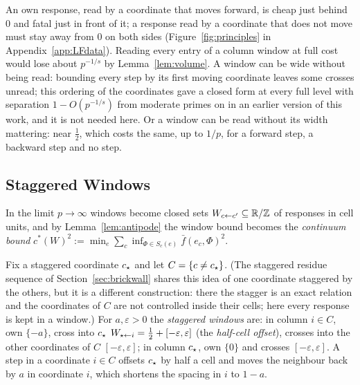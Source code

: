 An own response, read by a coordinate that moves forward, is cheap just behind $0$ and fatal just in front of it; a response read by a coordinate that does not move must stay away from $0$ on both sides (Figure~\ref{fig:principles} in Appendix~\ref{app:LFdata}). Reading every entry of a column window at full cost would lose about $p^{-1/s}$ by Lemma~\ref{lem:volume}. A window can be wide without being read: bounding every step by its first moving coordinate leaves some crosses unread; this ordering of the coordinates gave a closed form at every full level with separation $1-O(p^{-1/s})$ from moderate primes on in an earlier version of this work, and it is not needed here. Or a window can be read without its width mattering: near $\frac12$, which costs the same, up to $1/p$, for a forward step, a backward step and no step.

\subsection{Staggered Windows}\label{sec:staggered}
In the limit $p\to\infty$ windows become closed sets $W_{c\leftarrow c'}\subseteq\mathbb{R}/\mathbb{Z}$ of responses in cell units, and by Lemma~\ref{lem:antipode} the window bound becomes the \emph{continuum bound} $c^*(W)^2:=\min_e\sum_c\inf_{\Phi\in S_c(e)}\bar f(e_c,\Phi)^2$.

Fix a staggered coordinate $c_{\star}$ and let $C=\{c\ne c_{\star}\}$. (The staggered residue sequence of Section~\ref{sec:brickwall} shares this idea of one coordinate staggered by the others, but it is a different construction: there the stagger is an exact relation and the coordinates of $C$ are not controlled inside their cells; here every response is kept in a window.) For $a,\varepsilon>0$ the \emph{staggered windows} are: in column $i\in C$, own $\{-a\}$, cross into $c_{\star}$ $W_{\star\leftarrow i}=\tfrac12+[-\varepsilon,\varepsilon]$ (the \emph{half-cell offset}), crosses into the other coordinates of $C$ $[-\varepsilon,\varepsilon]$; in column $c_{\star}$, own $\{0\}$ and crosses $[-\varepsilon,\varepsilon]$. A step in a coordinate $i\in C$ offsets $c_{\star}$ by half a cell and moves the neighbour back by $a$ in coordinate $i$, which shortens the spacing in $i$ to $1-a$.

